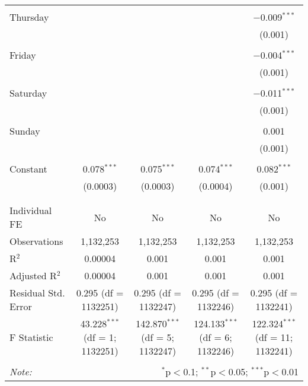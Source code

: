 \documentclass[
]{article}
\begin{document}
\begin{table}[!htbp]
{\begin{tabular}{@{\extracolsep{5pt}}lcccc}
  & & & & \\ 
 Thursday &  &  &  & $-$0.009$^{***}$ \\ 
  &  &  &  & (0.001) \\ 
  & & & & \\ 
 Friday &  &  &  & $-$0.004$^{***}$ \\ 
  &  &  &  & (0.001) \\ 
  & & & & \\ 
 Saturday &  &  &  & $-$0.011$^{***}$ \\ 
  &  &  &  & (0.001) \\ 
  & & & & \\ 
 Sunday &  &  &  & 0.001 \\ 
  &  &  &  & (0.001) \\ 
  & & & & \\ 
 Constant & 0.078$^{***}$ & 0.075$^{***}$ & 0.074$^{***}$ & 0.082$^{***}$ \\ 
  & (0.0003) & (0.0003) & (0.0004) & (0.001) \\ 
  & & & & \\ 
\hline \\[-1.8ex] 
Individual FE & No & No & No & No \\ 
Observations & 1,132,253 & 1,132,253 & 1,132,253 & 1,132,253 \\ 
R$^{2}$ & 0.00004 & 0.001 & 0.001 & 0.001 \\ 
Adjusted R$^{2}$ & 0.00004 & 0.001 & 0.001 & 0.001 \\ 
Residual Std. Error & 0.295 (df = 1132251) & 0.295 (df = 1132247) & 0.295 (df = 1132246) & 0.295 (df = 1132241) \\ 
F Statistic & 43.228$^{***}$ (df = 1; 1132251) & 142.870$^{***}$ (df = 5; 1132247) & 124.133$^{***}$ (df = 6; 1132246) & 122.324$^{***}$ (df = 11; 1132241) \\ 
\hline 
\hline \\[-1.8ex] 
\textit{Note:}  & \multicolumn{4}{r}{$^{*}$p$<$0.1; $^{**}$p$<$0.05; $^{***}$p$<$0.01} \\ 
\end{tabular}
} 
\end{table} 
\newpage
\end{document}
